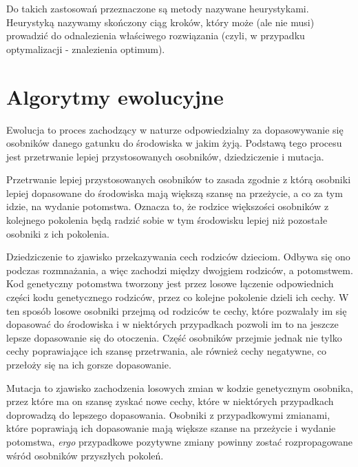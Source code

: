 \documentclass[twoside]{iisthesis}
\newcommand{\ergo}{\emph{ergo }}
\begin{document}
Do takich zastosowań przeznaczone są metody nazywane heurystykami. Heurystyką nazywamy skończony ciąg kroków, który może (ale nie musi) prowadzić do odnalezienia właściwego rozwiązania (czyli, w przypadku optymalizacji - znalezienia optimum).

\section{Algorytmy ewolucyjne} \label{section_eaShortDesc}

Ewolucja to proces zachodzący w naturze odpowiedzialny za dopasowywanie się osobników danego gatunku do środowiska w jakim żyją. Podstawą tego procesu jest przetrwanie lepiej przystosowanych osobników, dziedziczenie i mutacja.

Przetrwanie lepiej przystosowanych osobników to zasada zgodnie z którą osobniki lepiej dopasowane do środowiska mają większą szansę na przeżycie, a co za tym idzie, na wydanie potomstwa. Oznacza to, że rodzice większości osobników z kolejnego pokolenia będą radzić sobie w tym środowisku lepiej niż pozostałe osobniki z ich pokolenia.

Dziedziczenie to zjawisko przekazywania cech rodziców dzieciom. Odbywa się ono podczas rozmnażania, a więc zachodzi między dwojgiem rodziców, a potomstwem. Kod genetyczny potomstwa tworzony jest przez losowe łączenie odpowiednich części kodu genetycznego rodziców, przez co kolejne pokolenie dzieli ich cechy. W ten sposób losowe osobniki przejmą od rodziców te cechy, które pozwalały im się dopasować do środowiska i w niektórych przypadkach pozwoli im to na jeszcze lepsze dopasowanie się do otoczenia. Część osobników przejmie jednak nie tylko cechy poprawiające ich szansę przetrwania, ale również cechy negatywne, co przełoży się na ich gorsze dopasowanie.

Mutacja to zjawisko zachodzenia losowych zmian w kodzie genetycznym osobnika, przez które ma on szansę zyskać nowe cechy, które w niektórych przypadkach doprowadzą do lepszego dopasowania. Osobniki z przypadkowymi zmianami, które poprawiają ich dopasowanie mają większe szanse na przeżycie i wydanie potomstwa, \ergo przypadkowe pozytywne zmiany powinny zostać rozpropagowane wśród osobników przyszłych pokoleń.
\end{document}
